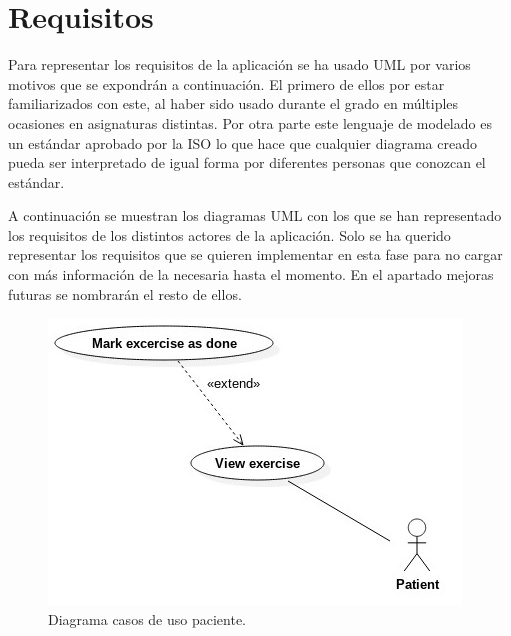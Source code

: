 \section{Requisitos}
Para representar los requisitos de la aplicación se ha usado UML\cite{uml} por varios
motivos que se expondrán a continuación. El primero de ellos por estar familiarizados
con este, al haber sido usado durante el grado en múltiples ocasiones en asignaturas
distintas. Por otra parte este lenguaje de modelado es un estándar aprobado por la ISO
lo que hace que cualquier diagrama creado pueda ser interpretado de igual forma por
diferentes personas que conozcan el estándar.

\medskip
A continuación se muestran los diagramas UML con los que se han representado los
requisitos de los distintos actores de la aplicación. Solo se ha querido representar los
requisitos que se quieren implementar en esta fase para no cargar con más información de
la necesaria hasta el momento. En el apartado mejoras futuras se nombrarán el resto de ellos.

\medskip
\begin{figure}
    \includegraphics[width=\linewidth]{./images/requisites/use-case-patient.jpeg}
    \caption{Diagrama casos de uso paciente.}
    \label{Diagrama casos de uso paciente.}
\end{figure}

